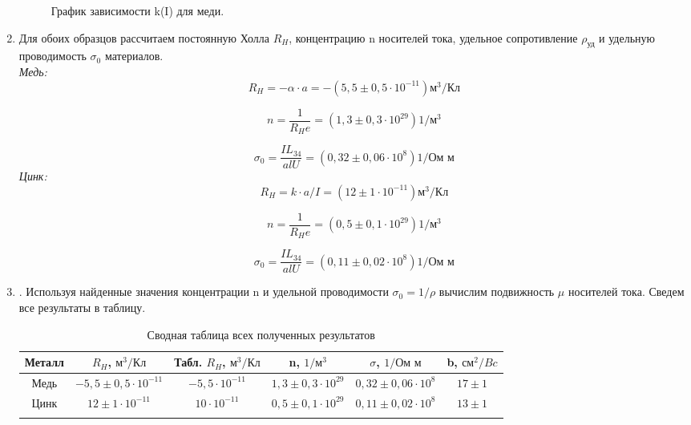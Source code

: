\documentclass[a4paper, 12pt]{article}%
\begin{document}
\begin{enumerate}
	\begin{figure}[H]
		\caption{График зависимости k(I) для меди.}
	\end{figure}
		
	\item Для обоих образцов рассчитаем постоянную Холла $R_H$, концентрацию n носителей тока,
	удельное сопротивление $\rho_{\text{уд}}$ и удельную проводимость $\sigma_0$ материалов.\\
	
	\textit{Медь:}\\
	$$ R_H = - \alpha \cdot a = - (5,5 \pm 0,5 \cdot 10^{-11}) \text{м}^3/\text{Кл}$$
	
	$$ n = \frac{1}{R_H e} = (1,3 \pm 0,3 \cdot 10^{29}) 1/\text{м}^3$$
	
	$$ \sigma_0 = \frac{IL_{34}}{al U} = (0,32 \pm 0,06 \cdot 10^8) 1/\text{Ом м} $$	
	\textit{Цинк:}\\
	$$ R_H = k \cdot a/I = (12 \pm 1 \cdot 10^{-11}) \text{м}^3/\text{Кл}$$
	
	$$ n = \frac{1}{R_H e} = (0,5 \pm 0,1 \cdot 10^{29}) 1/\text{м}^3$$
	
	$$ \sigma_0 = \frac{IL_{34}}{al U} = (0,11 \pm 0,02 \cdot 10^8) 1/\text{Ом м} $$	
	
	\item . Используя найденные значения концентрации n и удельной проводимости $\sigma_0 = 1/\rho$ вычислим подвижность $\mu$ носителей тока. Сведем все результаты в таблицу.
	
	\begin{longtable} {|c|c|c|c|c|c|}
		\hline
		Металл & $R_H$, $\text{м}^3/\text{Кл}$  & Табл. $R_H$, $\text{м}^3/\text{Кл}$ &  n, $1/\text{м}^3$ & $\sigma$, $1/\text{Ом м}$& b, $\text{см}^2/Bc$ \\ \hline
		Медь & $- 5,5 \pm 0,5 \cdot 10^{-11}$ &$ - 5,5 \cdot 10^{-11}$ & $1,3 \pm 0,3 \cdot 10^{29}$ & $0,32 \pm 0,06 \cdot 10^8$ &$17 \pm 1$   \\ \hline
		Цинк & $ 12 \pm 1 \cdot 10^{-11}$ & $10\cdot 10^{-11}$ & $ 0,5 \pm 0,1 \cdot 10^{29} $ & $0,11 \pm 0,02 \cdot 10^8$ &$ 13 \pm 1$ \\ \hline
		\caption{Сводная таблица всех полученных результатов}
	\end{longtable}
		

\end{enumerate}
\end{document}
